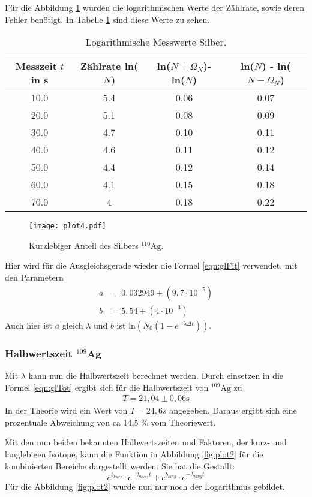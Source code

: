 Für die Abbildung \ref{fig:plot4} wurden die logarithmischen Werte der Zählrate, sowie deren Fehler benötigt.
In Tabelle \ref{tab:lnN2k} sind diese Werte zu sehen.

\begin{table}
  \centering
  \caption{Logarithmische Messwerte Silber.}
  \label{tab:lnN2k}
\begin{tabular}{c c c c}
  \toprule
  Messzeit $t$ in s & Zählrate ln($N$) & ln($N + \Omega_N$)- ln($N$) & ln($N$) - ln($N - \Omega_N$)\\
  \midrule
  10.0 & 5.4 & 0.06 & 0.07 \\
  20.0 & 5.1 & 0.08 & 0.09 \\
  30.0 & 4.7 & 0.10 & 0.11 \\
  40.0 & 4.6 & 0.11 & 0.12 \\
  50.0 & 4.4 & 0.12 & 0.14 \\
  60.0 & 4.1 & 0.15 & 0.18 \\
  70.0 & 4 & 0.18 & 0.22 \\
  \bottomrule
\end{tabular}
\end{table}
\FloatBarrier

\begin{figure}
  \centering
  \texttt{[image: plot4.pdf]}
  \caption{Kurzlebiger Anteil des Silbers $^{110}\text{Ag}$.}
  \label{fig:plot4}
\end{figure}
\FloatBarrier

Hier wird für die Ausgleichsgerade wieder die Formel \ref{eqn:glFit} verwendet, mit den Parametern 
\begin{align*}
  a &= 0,032949 \pm (9,7 \cdot 10^{-5}) \\
  b &= 5,54 \pm (4 \cdot 10^{-3})
\end{align*}
Auch hier ist $a$ gleich $\lambda$ und $b$ ist $\text{ln}(N_0(1-e^{-\lambda \Delta t}))$.

\subsubsection{Halbwertszeit $^{109}$Ag}

Mit $\lambda$ kann nun die Halbwertszeit berechnet werden.
Durch einsetzen in die Formel \ref{eqn:glTot} ergibt sich für die Halbwertszeit von $^{109}\text{Ag}$ zu 
\begin{align*}
  T = 21,04 \pm 0,06 \text{s}
\end{align*}
In der Theorie wird ein Wert von $T = 24,6 s$ \cite{Periode} angegeben.
Daraus ergibt sich eine prozentuale Abweichung von ca 14,5 \% vom Theoriewert.

Mit den nun beiden bekannten Halbwertszeiten und Faktoren, der kurz- und langlebigen Isotope, kann die Funktion in Abbildung \ref{fig:plot2} für die kombinierten Bereiche dargestellt werden.
Sie hat die Gestallt:
\begin{equation}
  e^{b_{kurz}} \cdot e^{-\lambda_{kurz} t} + e^{b_{lang}} \cdot e^{-\lambda_{lang} t}
\end{equation}
Für die Abbildung \ref{fig:plot2} wurde nun nur noch der Logarithmus gebildet.